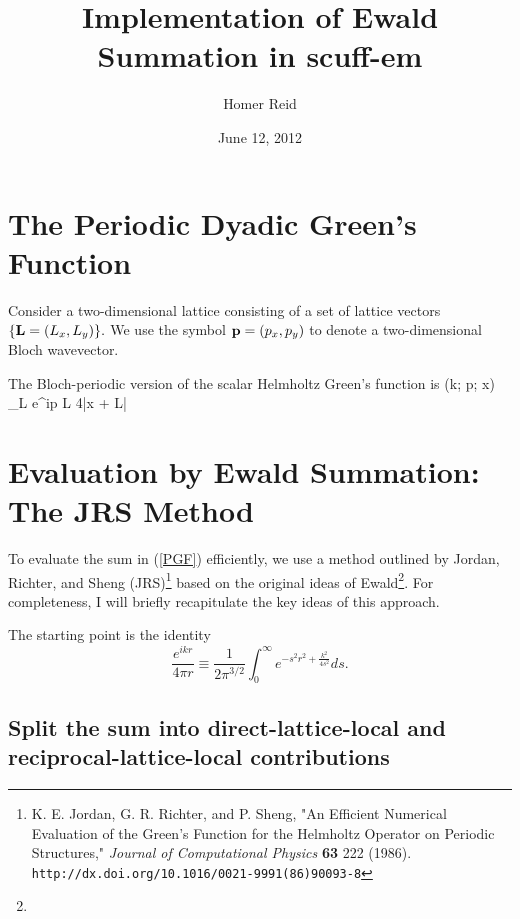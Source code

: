 \documentclass[letterpaper]{article}
\title {Implementation of Ewald Summation in {\sc scuff-em}}
\author {Homer Reid}
\date {June 12, 2012}
\newcommand{\GB}{\overline{G}}
\begin{document}
\pagestyle{myheadings}
\maketitle

\tableofcontents

\newpage

\section{The Periodic Dyadic Green's Function}

Consider a two-dimensional lattice consisting of a set of 
lattice vectors $\{\mathbf{L}=(L_x, L_y)\}.$
We use the symbol $\mathbf{p}=(p_x, p_y)$ to denote a two-dimensional
Bloch wavevector.

The Bloch-periodic version of the scalar Helmholtz Green's function is
{ \GB(k; \vb p; \vb x) 
  \equiv 
  \sum_{\vb L} e^{i\vb p \cdot \vb L} 
                    { 4\pi|\vb x + \vb L|}
}

\section{Evaluation by Ewald Summation: The JRS Method}

To evaluate the sum in (\ref{PGF}) efficiently, we use a method 
outlined by Jordan, Richter, and Sheng (JRS)\footnote{K. E. Jordan, G. R. Richter, 
and P. Sheng, "An Efficient Numerical Evaluation of the Green's 
Function for the Helmholtz Operator on Periodic Structures," 
\textit{Journal of Computational Physics} \textbf{63} 222 (1986).
\texttt{http://dx.doi.org/10.1016/0021-9991(86)90093-8}}
based on the original ideas of Ewald\footnote{}. For completeness,
I will briefly recapitulate the key ideas of this approach.

The starting point is the identity
$$ \frac{e^{ikr}}{4\pi r} 
   \equiv 
   \frac{1}{2\pi^{3/2}} \int_0^\infty e^{ -s^2 r^2 + \frac{k^2}{4s^2}} ds.
$$ 

\subsection*{Split the sum into direct-lattice-local and reciprocal-lattice-local
             contributions}
\end{document}
